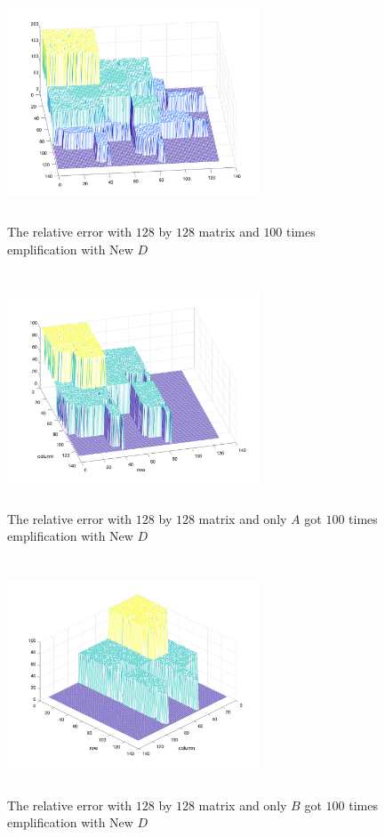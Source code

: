 \documentclass{article}
\begin{document}
\begin{figure}[h!]
    \centering
    \includegraphics[width=0.67\textwidth, height = 7cm]{128_100_3.png}
    \caption{The relative error with $128$ by $128$ matrix and $100$ times emplification with New $D$}
\end{figure}
\begin{figure}[h!]
    \centering
    \includegraphics[width=0.67\textwidth, height = 7cm]{128_100_3_A.png}
    \caption{The relative error with $128$ by $128$ matrix and only $A$ got $100$ times emplification with New $D$}
\end{figure}
\begin{figure}[h!]
    \centering
    \includegraphics[width=0.67\textwidth, height = 7cm]{128_100_3_B.png}
    \caption{The relative error with $128$ by $128$ matrix and only $B$ got $100$ times emplification with New $D$}
\end{figure}
\end{document}
